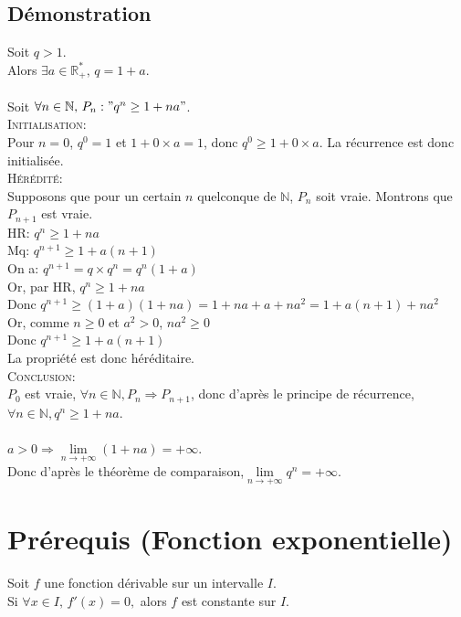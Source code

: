 \documentclass[12px]{article}
\begin{document}
	\subsection{Démonstration}
	Soit $q>1$.\\
	Alors $\exists a\in\mathbb{R}_+^*, \,q=1+a$.\\
	\\
	Soit $\forall n\in\mathbb{N}, \,P_n:"q^n\geq 1+na"$.\\
	\textsc{Initialisation:}\\
	Pour $n=0$, $q^0=1$ et $1+0\times a=1$, donc $q^0\geq 1+0\times a$. La récurrence est donc initialisée.\\
	\textsc{Hérédité:}\\
	Supposons que pour un certain $n$ quelconque de $\mathbb{N}$, $P_n$ soit vraie. Montrons que $P_{n+1}$ est vraie.\\
	HR: $q^n \geq 1+na$\\
	Mq: $q^{n+1} \geq 1+a(n+1)$\\
	On a: $q^{n+1}=q\times q^n =q^n(1+a)$\\
	Or, par HR, $q^n \geq 1+na$\\
	Donc $q^{n+1} \geq (1+a)(1+na) = 1+na+a+na^2 = 1+a(n+1)+na^2$\\
	Or, comme $n\geq 0$ et $a^2>0$, $na^2\geq 0$\\
	Donc $q^{n+1}\geq 1+a(n+1)$\\
	La propriété est donc héréditaire.\\
	\textsc{Conclusion:}\\
	$P_0$ est vraie, $\forall n\in\mathbb{N},P_n\Rightarrow P_{n+1}$, donc d'après le principe de récurrence, $\forall n\in\mathbb{N}, q^n\geq 1+na$.\\
	\\
	$a>0 \Rightarrow \lim\limits_{n\rightarrow +\infty}(1+na)= +\infty$.\\
	Donc d'après le théorème de comparaison,$ \lim\limits_{n\rightarrow +\infty}q^n=+\infty$.
	
	\section{Prérequis (Fonction exponentielle)}
	Soit $f$ une fonction dérivable sur un intervalle $I$.\\
	Si $\forall x\in I, \,f'(x)=0,$ alors $f$ est constante sur $I$.
	
\end{document}

